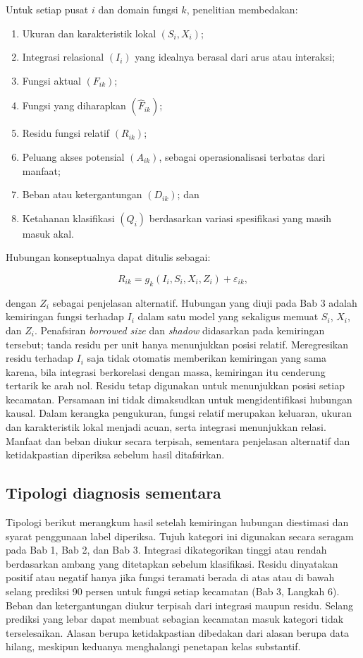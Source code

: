 \documentclass[12pt,a4paper,oneside,openany,indonesian]{report}
\begin{document}
Untuk setiap pusat $i$ dan domain fungsi $k$, penelitian membedakan:

\begin{enumerate}
  \item Ukuran dan karakteristik lokal $(S_i,X_i)$;
  \item Integrasi relasional $(I_i)$ yang idealnya berasal dari arus atau interaksi;
  \item Fungsi aktual $(F_{ik})$;
  \item Fungsi yang diharapkan $(\widehat{F}_{ik})$;
  \item Residu fungsi relatif $(R_{ik})$;
  \item Peluang akses potensial $(A_{ik})$, sebagai operasionalisasi terbatas dari manfaat;
  \item Beban atau ketergantungan $(D_{ik})$; dan
  \item Ketahanan klasifikasi $(Q_i)$ berdasarkan variasi spesifikasi yang masih masuk akal.
\end{enumerate}

Hubungan konseptualnya dapat ditulis sebagai:

\[
R_{ik}=g_k(I_i,S_i,X_i,Z_i)+\varepsilon_{ik},
\]

\noindent dengan $Z_i$ sebagai penjelasan alternatif. Hubungan yang diuji pada Bab 3 adalah kemiringan fungsi terhadap $I_i$ dalam satu model yang sekaligus memuat $S_i$, $X_i$, dan $Z_i$. Penafsiran \textit{borrowed size} dan \textit{shadow} didasarkan pada kemiringan tersebut; tanda residu per unit hanya menunjukkan posisi relatif. Meregresikan residu terhadap $I_i$ saja tidak otomatis memberikan kemiringan yang sama karena, bila integrasi berkorelasi dengan massa, kemiringan itu cenderung tertarik ke arah nol. Residu tetap digunakan untuk menunjukkan posisi setiap kecamatan. Persamaan ini tidak dimaksudkan untuk mengidentifikasi hubungan kausal. Dalam kerangka pengukuran, fungsi relatif merupakan keluaran, ukuran dan karakteristik lokal menjadi acuan, serta integrasi menunjukkan relasi. Manfaat dan beban diukur secara terpisah, sementara penjelasan alternatif dan ketidakpastian diperiksa sebelum hasil ditafsirkan.

\subsection{Tipologi diagnosis sementara}

Tipologi berikut merangkum hasil setelah kemiringan hubungan diestimasi dan syarat penggunaan label diperiksa. Tujuh kategori ini digunakan secara seragam pada Bab 1, Bab 2, dan Bab 3. Integrasi dikategorikan tinggi atau rendah berdasarkan ambang yang ditetapkan sebelum klasifikasi. Residu dinyatakan positif atau negatif hanya jika fungsi teramati berada di atas atau di bawah selang prediksi 90 persen untuk fungsi setiap kecamatan (Bab 3, Langkah 6). Beban dan ketergantungan diukur terpisah dari integrasi maupun residu. Selang prediksi yang lebar dapat membuat sebagian kecamatan masuk kategori tidak terselesaikan. Alasan berupa ketidakpastian dibedakan dari alasan berupa data hilang, meskipun keduanya menghalangi penetapan kelas substantif.
\end{document}
